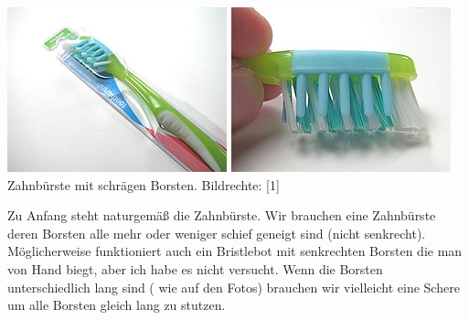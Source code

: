 \documentclass[10pt,a4paper,ngerman,twoside]{article} %
\begin{document}
\begin{multicols}{3}
\begin{center}
\includegraphics[width=\linewidth]{bristlebot/bristlebot2.jpg}
\includegraphics[width=\linewidth]{bristlebot/bristlebot3.jpg}\\
\footnotesize{Zahnbürste mit schrägen Borsten. Bildrechte: [1]}
\end{center}

Zu Anfang steht naturgemäß die Zahnbürste. Wir brauchen eine Zahnbürste deren Borsten alle mehr oder weniger schief geneigt sind (nicht senkrecht). Möglicherweise funktioniert auch ein Bristlebot mit senkrechten Borsten die man von Hand biegt, aber ich habe es nicht versucht. Wenn die Borsten unterschiedlich lang sind ( wie auf den Fotos) brauchen wir vielleicht eine Schere um alle Borsten gleich lang zu stutzen. \\
 

\end{multicols}
\end{document}
